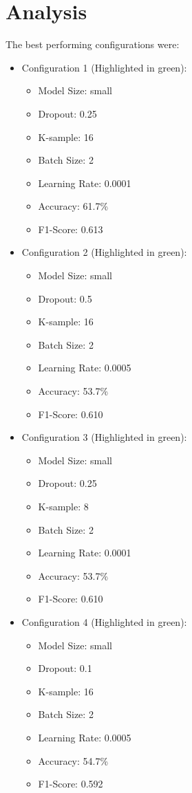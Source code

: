 \documentclass{article}
\begin{document}
\section{Analysis}
The best performing configurations were:
\begin{itemize}
    \item Configuration 1 (Highlighted in green):
    \begin{itemize}
        \item Model Size: small
        \item Dropout: 0.25
        \item K-sample: 16
        \item Batch Size: 2
        \item Learning Rate: 0.0001
        \item Accuracy: 61.7\%
        \item F1-Score: 0.613
    \end{itemize}
    \item Configuration 2 (Highlighted in green):
    \begin{itemize}
        \item Model Size: small
        \item Dropout: 0.5
        \item K-sample: 16
        \item Batch Size: 2
        \item Learning Rate: 0.0005
        \item Accuracy: 53.7\%
        \item F1-Score: 0.610
    \end{itemize}
    \item Configuration 3 (Highlighted in green):
    \begin{itemize}
        \item Model Size: small
        \item Dropout: 0.25
        \item K-sample: 8
        \item Batch Size: 2
        \item Learning Rate: 0.0001
        \item Accuracy: 53.7\%
        \item F1-Score: 0.610
    \end{itemize}
    \item Configuration 4 (Highlighted in green):
    \begin{itemize}
        \item Model Size: small
        \item Dropout: 0.1
        \item K-sample: 16
        \item Batch Size: 2
        \item Learning Rate: 0.0005
        \item Accuracy: 54.7\%
        \item F1-Score: 0.592
    \end{itemize}
\end{itemize}
\end{document}
